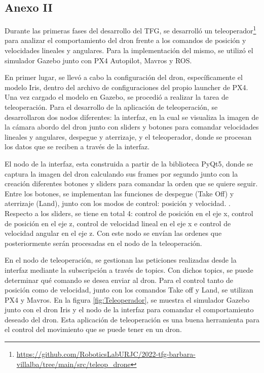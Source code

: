 \begin{appendices}
    \chapter*{Anexo II}
    \label{cap:anexoII}
\setcounter{page}{1}
Durante las primeras fases del desarrollo del TFG, se desarrolló un teleoperador\footnote{\url{https://github.com/RoboticsLabURJC/2022-tfg-barbara-villalba/tree/main/src/teleop_drone}} 
para analizar el comportamiento del dron frente a los comandos de posición y velocidades lineales y angulares.
Para la implementación del mismo, se utilizó el simulador Gazebo junto con PX4 Autopilot, Mavros y ROS. 

En primer lugar, se llevó a cabo la configuración del dron, específicamente el modelo Iris, dentro del archivo de configuraciones del propio launcher de PX4. Una vez cargado 
el modelo en Gazebo, se procedió a realizar la tarea de teleoperación. Para el desarrollo de la aplicación de teleoperación, se desarrollaron 
dos nodos diferentes: la interfaz, en la cual se visualiza la imagen de la cámara abordo del dron junto con sliders y botones para comandar velocidades lineales y angulares, despegue y aterrizaje, y
el teleoperador, donde se procesan los datos que se reciben a través de la interfaz. 

El nodo de la interfaz, esta construida a partir de la biblioteca PyQt5, donde se captura la imagen del dron calculando sus frames por segundo junto con la creación diferentes botones y sliders para comandar 
la orden que se quiere seguir. Entre los botones, se implementan las funciones de despegue (Take Off) y aterrizaje (Land), junto con los modos de control: posición y velocidad.
. Respecto a los sliders, se tiene en total
4: control de posición en el eje x, control de posición en el eje z, control de velocidad lineal en el eje x e control de velocidad angular en el eje z.  Con este nodo se envían las ordenes que 
posteriormente serán procesadas en el nodo de la teleoperación.

En el nodo de teleoperación, se gestionan las peticiones realizadas desde la interfaz mediante la subscripción a través de topics. Con dichos topics, se puede determinar qué comando
se desea enviar al dron. Para el control tanto de posición como de velocidad, junto con los comandos Take off y Land, se utilizan PX4 y Mavros. En la figura \ref{fig:Teleoperador}, 
se muestra el simulador Gazebo junto con el dron Iris y el nodo de la interfaz para comandar el comportamiento deseado del dron. Esta aplicación de teleoperación es una buena herramienta 
para el control del movimiento que se puede tener en un dron.


\end{appendices}
